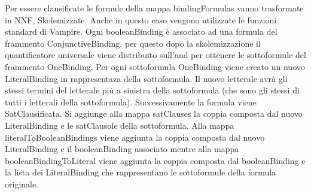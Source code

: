 \documentclass[./main.tex]{subfiles}
\begin{document}

Per essere clausificate le formule della mappa bindingFormulas vanno trasformate in NNF, Skolemizzate.
Anche in questo caso vengono utilizzate le funzioni standard di Vampire. 
Ogni booleanBinding è associato ad una formula del frammento ConjunctiveBinding,
per questo dopo la skolemizzazione il quantificatore universale viene distribuito sull'and per ottenere le sottoformule del frammento OneBinding.
Per ogni sottoformula OneBinding viene creato un nuovo LiteralBinding in rappresentaza della sottoformula.
Il nuovo letterale avrà gli stessi termini del letterale più a sinistra della sottoformula (che sono gli stessi di tutti i letterali della sottoformula).
Successivamente la formula viene SatClausificata. 
Si aggiunge alla mappa satClauses la coppia composta dal nuovo LiteralBinding e le satClausole della sottoformula.
Alla mappa literalToBooleanBindings viene aggiunta la coppia composta dal nuovo LiteralBinding e il booleanBinding associato mentre alla mappa
booleanBindingToLiteral viene aggiunta la coppia composta dal booleanBinding e la lista dei LiteralBinding che rappresentano le sottoformule della formula originale.  


\end{document}
